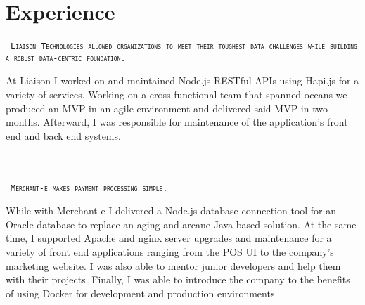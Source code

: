 \documentclass{muratcan_cv}
\begin{document}
\headerview
\vspace{1ex}
%
%
\section{Experience}
    \mbox { \scshape \hspace{1.2em} \tiny{\texttt{Liaison Technologies allowed organizations
     to meet their toughest data challenges while building a robust data-centric foundation.}}}\\
    \indent \indent \begin{minipage}{0.96\linewidth} \footnotesize
     At Liaison I worked on and maintained Node.js RESTful APIs using Hapi.js for a variety of services. Working on a cross-functional team that spanned oceans we produced an MVP in an agile environment and delivered said MVP in two months. Afterward, I was responsible for maintenance of the application's front end and back end systems.
    \end{minipage} \\[0.1cm]\\
    \mbox { \scshape \hspace{1.2em} \tiny{\texttt{Merchant-e makes payment processing simple.}}}\\
    \indent \indent \begin{minipage}{0.96\linewidth} \footnotesize
     While with Merchant-e I delivered a Node.js database connection tool for an Oracle database to replace an aging and arcane Java-based solution. At the same time, I supported Apache and nginx server upgrades and maintenance for a variety of front end applications ranging from the POS UI to the company's marketing website. I was also able to mentor junior developers and help them with their projects. Finally, I was able to introduce the company to the benefits of using Docker for development and production environments.
    \end{minipage} \\[0.1cm]\\
\end{document}
